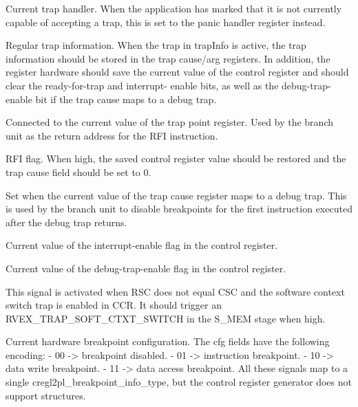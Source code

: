 \ifaceSubGroup{}
Current trap handler. When the application has marked that it is not currently 
capable of accepting a trap, this is set to the panic handler register instead.

\ifaceSubGroup{}
Regular trap information. When the trap in trapInfo is active, the trap 
information should be stored in the trap cause/arg registers. In addition, the 
register hardware should save the current value of the control register and 
should clear the ready-for-trap and interrupt- enable bits, as well as the 
debug-trap-enable bit if the trap cause maps to a debug trap.

\ifaceSubGroup{}
Connected to the current value of the trap point register. Used by the branch 
unit as the return address for the RFI instruction.

\ifaceSubGroup{}
RFI flag. When high, the saved control register value should be restored and the 
trap cause field should be set to 0.

\ifaceSubGroup{}
Set when the current value of the trap cause register maps to a debug trap. This 
is used by the branch unit to disable breakpoints for the first instruction 
executed after the debug trap returns.

\ifaceSubGroup{}
Current value of the interrupt-enable flag in the control register.

\ifaceSubGroup{}
Current value of the debug-trap-enable flag in the control register.

\ifaceSubGroup{}
This signal is activated when RSC does not equal CSC and the software context
switch trap is enabled in CCR. It should trigger an RVEX_TRAP_SOFT_CTXT_SWITCH
in the S_MEM stage when high.

\ifaceSubGroup{}
Current hardware breakpoint configuration. The cfg fields have the following
encoding:
 - 00 -> breakpoint disabled.
 - 01 -> instruction breakpoint.
 - 10 -> data write breakpoint.
 - 11 -> data access breakpoint.
All these signals map to a single cregl2pl_breakpoint_info_type, but the
control register generator does not support structures.

